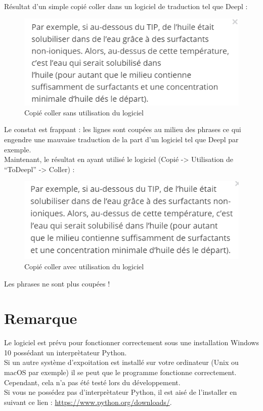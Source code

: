 \documentclass[a4paper, 11pt, twoside, table]{article}
\begin{document}
Résultat d'un simple copié coller dans un logiciel de traduction tel que Deepl :
\begin{figure}[H]
	\centering 
	\includegraphics{data/text_sans_script.png}
	\caption{Copié coller sans utilisation du logiciel}
	\label{fig_text_sans_script}
\end{figure}
Le constat est frappant : les lignes sont coupées au milieu des phrases ce qui engendre une mauvaise traduction de la part d'un logiciel tel que Deepl par exemple.\\

Maintenant, le résultat en ayant utilisé le logiciel (Copié -> Utilisation de \enquote{ToDeepl} -> Coller) :
\begin{figure}[H]
	\centering 
	\includegraphics{data/text_script.png}
	\caption{Copié coller avec utilisation du logiciel}
	\label{fig_text_script}
\end{figure}
\noindent
Les phrases ne sont plus coupées !

\section{Remarque}
Le logiciel est prévu pour fonctionner correctement sous une installation Windows 10 possédant un interprètateur Python.\\

Si un autre système d'expoitation est installé sur votre ordinateur (Unix ou macOS par exemple) il se peut que le programme fonctionne correctement. Cependant, cela n'a pas été testé lors du développement.\\

Si vous ne possédez pas d'interprètateur  Python, il est aisé de l'installer en suivant ce lien : \url{https://www.python.org/downloads/}.
\end{document}
